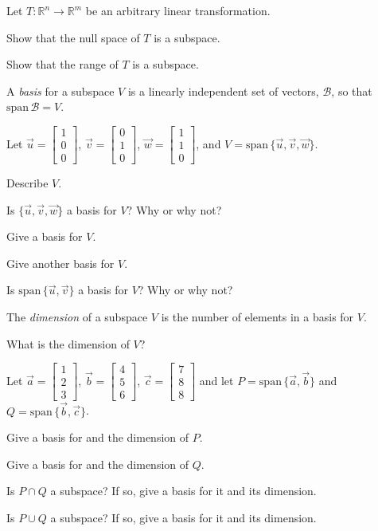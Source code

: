 \documentclass[14pt]{problemset}
\newcommand{\R}{\mathbb{R}}
\renewcommand{\span}{\mathrm{span}\,}
\newcommand{\Span}{\mathrm{span}\,}
\newcommand{\mat}[1]{\begin{bmatrix}#1\end{bmatrix}}
\begin{document}
	\question
	Let $T:\R^n\to\R^m$ be an arbitrary linear transformation.
	\begin{parts}
		\item Show that the null space of $T$ is a subspace.
		\item Show that the range of $T$ is a subspace.
	\end{parts}



	\begin{definition}[Basis]
		A \emph{basis} for a subspace $V$ is a linearly independent set of vectors, $\mathcal B$,
		so that $\Span\mathcal B=V$.
	\end{definition}

	\question
	Let $\vec u=\mat{1\\0\\0}$, $\vec v=\mat{0\\1\\0}$, $\vec w=\mat{1\\1\\0}$, and $V=\span\{\vec u,\vec v,\vec w\}$.
	\begin{parts}
		\item Describe $V$.
		\item Is $\{\vec u,\vec v,\vec w\}$ a basis for $V$?  Why or why not?
		\item Give a basis for $V$.
		\item Give another basis for $V$.
		\item Is $\Span\{\vec u,\vec v\}$ a basis for $V$?  Why or why not?
	\end{parts}

	\begin{definition}[Dimension]
		The \emph{dimension} of a subspace $V$ is the number of elements in a basis for $V$.
	\end{definition}

	\begin{parts}[resume]
		\item What is the dimension of $V$?
	\end{parts}


	\question
	Let $\vec a=\mat{1\\2\\3}$, $\vec b=\mat{4\\5\\6}$, $\vec c=\mat{7\\8\\8}$ and 
	let $P=\span\{\vec a,\vec b\}$ and $Q=\span\{\vec b,\vec c\}$.
	\begin{parts}
		\item Give a basis for and the dimension of $P$.
		\item Give a basis for and the dimension of $Q$.
		\item Is $P\cap Q$ a subspace? If so, give a basis for it and its dimension.
		\item Is $P\cup Q$ a subspace? If so, give a basis for it and its dimension.
	\end{parts}
\end{document}

